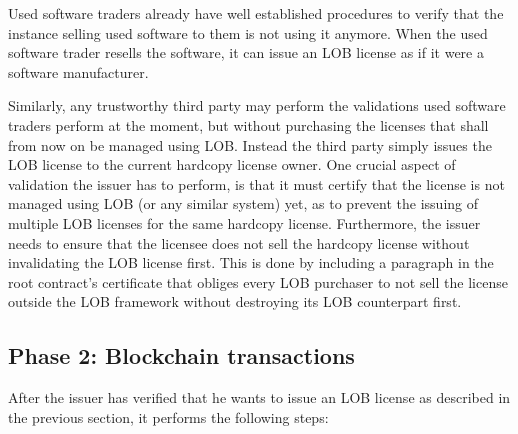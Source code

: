 \documentclass[a4paper]{article}
\begin{document}
Used software traders already have well established procedures to verify that the instance selling used software to them is not using it anymore. When the used software trader resells the software, it can issue an LOB license as if it were a software manufacturer.

Similarly, any trustworthy third party may perform the validations used software traders perform at the moment, but without purchasing the licenses that shall from now on be managed using LOB. Instead the third party simply issues the LOB license to the current hardcopy license owner. One crucial aspect of validation the issuer has to perform, is that it must certify that the license is not managed using LOB (or any similar system) yet, as to prevent the issuing of multiple LOB licenses for the same hardcopy license. Furthermore, the issuer needs to ensure that the licensee does not sell the hardcopy license without invalidating the LOB license first. This is done by including a paragraph in the root contract's certificate that obliges every LOB purchaser to not sell the license outside the LOB framework without destroying its LOB counterpart first.

\subsection{Phase 2: Blockchain transactions}

After the issuer has verified that he wants to issue an LOB license as described in the previous section, it performs the following steps:
\end{document}
